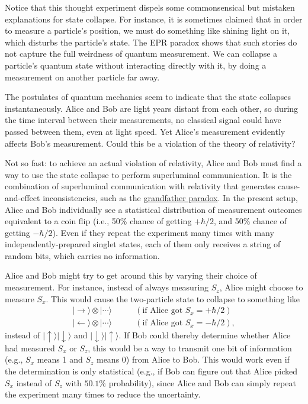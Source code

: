 \documentclass[pra,12pt]{revtex4-2}
\begin{document}
Notice that this thought experiment dispels some commonsensical but
mistaken explanations for state collapse.  For instance, it is
sometimes claimed that in order to measure a particle's position, we
must do something like shining light on it, which disturbs the
particle's state.  The EPR paradox shows that such stories do not
capture the full weirdness of quantum measurement.  We can collapse a
particle's quantum state without interacting directly with it, by
doing a measurement on another particle far away.

The postulates of quantum mechanics seem to indicate that the state
collapses instantaneously.  Alice and Bob are light years distant from
each other, so during the time interval between their measurements, no
classical signal could have passed between them, even at light speed.
Yet Alice's measurement evidently affects Bob's measurement.  Could
this be a violation of the theory of relativity?

Not so fast: to achieve an actual violation of relativity, Alice and
Bob must find a way to use the state collapse to perform superluminal
communication.  It is the combination of superluminal communication
with relativity that generates cause-and-effect inconsistencies, such
as the
\href{https://en.wikipedia.org/wiki/Temporal_paradox#Grandfather_paradox}{grandfather
  paradox}.  In the present setup, Alice and Bob individually see a
statistical distribution of measurement outcomes equivalent to a coin
flip (i.e., 50\% chance of getting $+\hbar/2$, and 50\% chance of
getting $-\hbar/2$).  Even if they repeat the experiment many times
with many independently-prepared singlet states, each of them only
receives a string of random bits, which carries no information.

Alice and Bob might try to get around this by varying their choice of
measurement.  For instance, instead of always measuring $S_z$, Alice
might choose to measure $S_x$.  This would cause the two-particle
state to collapse to something like
\begin{align*}
  |\!\rightarrow\rangle \otimes |\cdots\rangle &\qquad(\textrm{if Alice got $S_x = +\hbar/2$}) \\
  |\!\leftarrow\rangle \otimes |\cdots\rangle &\qquad(\textrm{if Alice got $S_x = -\hbar/2$}),
\end{align*}
instead of $|\!\uparrow\rangle |\!\downarrow\rangle$ and
$|\!\downarrow\rangle |\!\uparrow\rangle$.  If Bob could thereby
determine whether Alice had measured $S_x$ or $S_z$, this would be a
way to transmit one bit of information (e.g., $S_x$ means 1 and $S_z$
means 0) from Alice to Bob.  This would work even if the determination
is only statistical (e.g., if Bob can figure out that Alice picked
$S_x$ instead of $S_z$ with $50.1\%$ probability), since Alice and Bob
can simply repeat the experiment many times to reduce the uncertainty.
\end{document}
